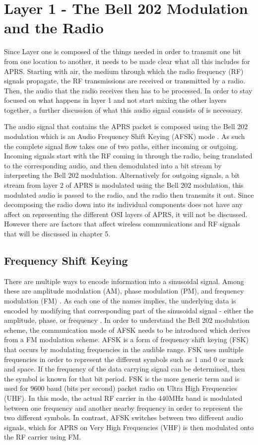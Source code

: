 \section{Layer 1 - The Bell 202 Modulation and the Radio}
Since Layer one is composed of the things needed in order to transmit one bit from one location to another, it needs to be made clear what all this includes for APRS. Starting with air, the medium through which the radio frequency (RF) signals propagate, the RF transmissions are received or transmitted by a radio. Then, the audio that the radio receives then has to be processed. In order to stay focused on what happens in layer 1 and not start mixing the other layers together, a further discussion of what this audio signal consists of is necessary.

The audio signal that contains the APRS packet is composed using the Bell 202 modulation which is an Audio Frequency Shift Keying (AFSK) mode \cite{}. As such the complete signal flow takes one of two paths, either incoming or outgoing. Incoming signals start with the RF coming in through the radio, being translated to the corresponding audio, and then demodulated into a bit stream by interpreting the Bell 202 modulation. Alternatively for outgoing signals, a bit stream from layer 2 of APRS is modulated using the Bell 202 modulation, this modulated audio is passed to the radio, and the radio then transmits it out. Since decomposing the radio down into its individual components does not have any affect on representing the different OSI layers of APRS, it will not be discussed. However there are factors that affect wireless communications and RF signals that will be discussed in chapter 5.

\subsection{Frequency Shift Keying}
There are multiple ways to encode information into a sinusoidal signal. Among these are amplitude modulation (AM), phase modulation (PM), and frequency modulation (FM) \cite{Goleniewski2006}. As each one of the names implies, the underlying data is encoded by modifying that corresponding part of the sinusoidal signal - either the amplitude, phase, or frequency \cite{Instruments2014}. In order to understand the Bell 202 modulation scheme, the communication mode of AFSK needs to be introduced which derives from a FM modulation scheme. AFSK is a form of frequency shift keying (FSK) that occurs by modulating frequencies in the audible range. FSK uses multiple frequencies in order to represent the different symbols such as 1 and 0 or mark and space. If the frequency of the data carrying signal can be determined, then the symbol is known for that bit period. FSK is the more generic term and is used for 9600 baud (bits per second) packet radio on Ultra High Frequencies (UHF). In this mode, the actual RF carrier in the 440MHz band is modulated between one frequency and another nearby frequency in order to represent the two different symbols. In contrast, AFSK switches between two different audio signals, which for APRS on Very High Frequencies (VHF) is then modulated onto the RF carrier using FM.


